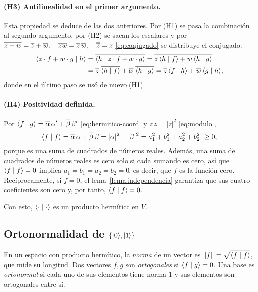 \paragraph{(H3) Antilinealidad en el primer argumento.}
Esta propiedad se deduce de las dos anteriores. Por (H1) se pasa la combinación al segundo
argumento, por (H2) se sacan los escalares y por $\overline{z+w}=\overline z+\overline w,\quad\penalty0 \overline{zw}=\overline z\,\overline w,\quad\penalty0 \overline{\overline z}=z$ \eqref{eq:conjugado} se distribuye el
conjugado:
\[
\begin{aligned}
  \langle z\cdot f+w\cdot g\mid h\rangle
  &=\overline{\langle h\mid z\cdot f+w\cdot g\rangle}
   =\overline{z\,\langle h\mid f\rangle+w\,\langle h\mid g\rangle}\\
  &=\overline z\;\overline{\langle h\mid f\rangle}+\overline w\;\overline{\langle h\mid g\rangle}
   =\overline z\,\langle f\mid h\rangle+\overline w\,\langle g\mid h\rangle ,
\end{aligned}
\]
donde en el último paso se usó de nuevo (H1).

\paragraph{(H4) Positividad definida.}
Por $\langle f\mid g\rangle=\overline\alpha\,\alpha'+\overline\beta\,\beta'$ \eqref{eq:hermitico-coord} y $z\,\overline z=|z|^2$ \eqref{eq:modulo},
\[
  \langle f\mid f\rangle=\overline\alpha\,\alpha+\overline\beta\,\beta=|\alpha|^2+|\beta|^2
  =a_1^2+b_1^2+a_2^2+b_2^2\ \ge 0 ,
\]
porque es una suma de cuadrados de números reales. Además, una suma de cuadrados de números
reales es cero solo si cada sumando es cero, así que $\langle f\mid f\rangle=0$ implica
$a_1=b_1=a_2=b_2=0$, es decir, que $f$ es la función cero. Recíprocamente, si $f=0$, el
lema~\ref{lema:independencia} garantiza que sus cuatro coeficientes son cero y, por tanto,
$\langle f\mid f\rangle=0$.

\medskip
Con esto, $\langle \cdot\mid \cdot\rangle$ es un producto hermítico en $V$.

\subsection*{Ortonormalidad de $\{\lvert 0\rangle,\lvert 1\rangle\}$}

\begin{definicionT}
En un espacio con producto hermítico, la \emph{norma} de un vector es
$\lVert f\rVert=\sqrt{\langle f\mid f\rangle}$, que mide su longitud. Dos vectores $f,g$ son
\emph{ortogonales} si $\langle f\mid g\rangle=0$. Una base es \emph{ortonormal} si cada uno de sus elementos
tiene norma $1$ y sus elementos son ortogonales entre sí.
\end{definicionT}

